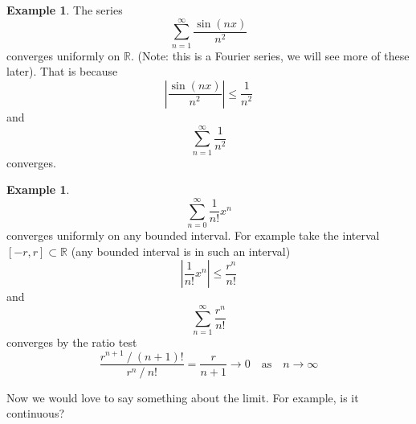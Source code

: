 \documentclass[12pt]{book}
\newcommand{\abs}[1]{\left\lvert {#1} \right\rvert}
\newcommand{\R}{{\mathbb{R}}}
\theoremstyle{plain}
\theoremstyle{remark}
\theoremstyle{definition}
\theoremstyle{exercise}
\theoremstyle{example}
\newtheorem{example}[thm]{Example}
\begin{document}
\begin{example}
The series
\begin{equation*}
\sum_{n=1}^\infty \frac{\sin(nx)}{n^2}
\end{equation*}
converges uniformly on $\R$. (Note: this is a Fourier series,
we will see more of these later).  That is because
\begin{equation*}
\abs{\frac{\sin(nx)}{n^2}} \leq 
\frac{1}{n^2}
\end{equation*}
and
\begin{equation*}
\sum_{n=1}^\infty \frac{1}{n^2}
\end{equation*}
converges.
\end{example}

\begin{example}
\begin{equation*}
\sum_{n=0}^\infty \frac{1}{n!} x^n
\end{equation*}
converges uniformly on any bounded interval.  For
example take the interval $[-r,r] \subset \R$  (any bounded interval
is in such an interval)
\begin{equation*}
\abs{\frac{1}{n!} x^n} \leq 
\frac{r^n}{n!}
\end{equation*}
and
\begin{equation*}
\sum_{n=1}^\infty \frac{r^n}{n!}
\end{equation*}
converges by the ratio test
\begin{equation*}
\frac{r^{n+1} ~ / ~ (n+1)!}{r^{n} ~ / ~ n!}
=
\frac{r}{n+1}
\to 0
\quad \text{as} \quad n \to \infty
\end{equation*}
\end{example}

Now we would love to say something about the limit.  For example, is it
continuous?

%
%
%
%
%
\end{document}
